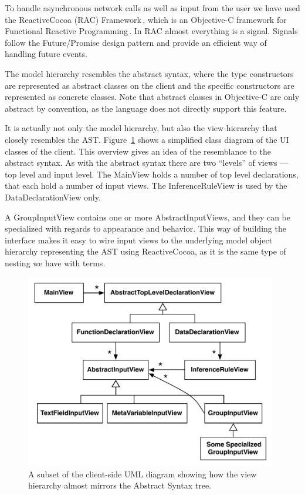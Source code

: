 To handle asynchronous network calls as well as input from the user we have
used the ReactiveCocoa (RAC) Framework\,\cite{reactiveCocoa}, which is an Objective-C framework for
Functional Reactive Programming\,\cite{Furrow:FunctionalReactiveProgramming}. In RAC almost everything is a
signal. Signals follow the Future/Promise design pattern and provide an
efficient way of handling future events.

The model hierarchy resembles the abstract syntax,
where the type constructors are represented as abstract classes on the client
and the specific constructors are represented as concrete classes. Note that abstract classes in
Objective-C are only abstract by convention, as the language does not directly
support this feature.

It is actually not only the model hierarchy, but also the view hierarchy that closely resembles the AST\@. Figure~\ref{fig:clientViewArchitecture} shows a simplified class diagram of the UI classes of the client. This overview gives an idea of
the resemblance to the abstract syntax. As with the abstract syntax there are
two ``levels'' of views --- top level and input level. The MainView holds a
number of top level declarations, that each hold a number of input views. The
InferenceRuleView is used by the DataDeclarationView only.

A GroupInputView contains one or more AbstractInputViews, and they can be specialized with regards to appearance and behavior. This way of building
the interface makes it easy to wire input views to the underlying model object
hierarchy representing the AST using ReactiveCocoa, as it is the same type of nesting we have with terms. 

\begin{figure}
	\centering
		\includegraphics[width=110mm]{diagrams/client_side_class_diagram.pdf}
	\caption{A subset of the client-side UML diagram showing how the view hierarchy
	almost mirrors the Abstract Syntax tree. }
\label{fig:clientViewArchitecture}
\end{figure}
